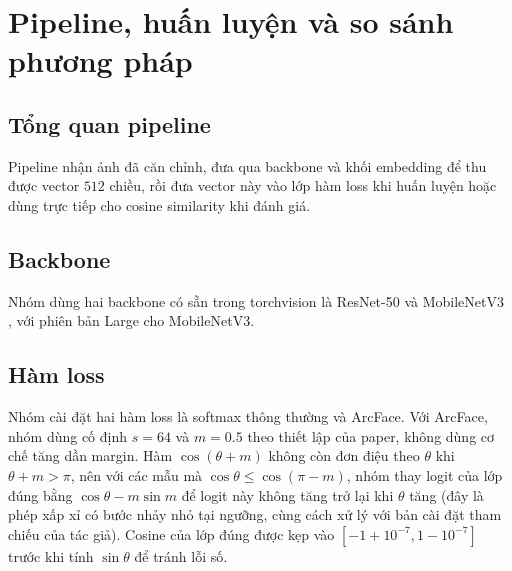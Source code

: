 \documentclass[a4paper,12pt]{article}
\begin{document}
\section{Pipeline, huấn luyện và so sánh phương pháp}\label{sec:training}

\subsection{Tổng quan pipeline}
Pipeline nhận ảnh đã căn chỉnh, đưa qua backbone và khối embedding để thu được vector $512$ chiều, rồi đưa vector này vào lớp hàm loss khi huấn luyện hoặc dùng trực tiếp cho cosine similarity khi đánh giá.

\subsection{Backbone}
Nhóm dùng hai backbone có sẵn trong torchvision là ResNet-50 \cite{he2016resnet} và MobileNetV3 \cite{howard2019mobilenetv3}, với phiên bản Large cho MobileNetV3.

\subsection{Hàm loss}
Nhóm cài đặt hai hàm loss là softmax thông thường và ArcFace. Với ArcFace, nhóm dùng cố định $s = 64$ và $m = 0.5$ theo thiết lập của paper, không dùng cơ chế tăng dần margin. Hàm $\cos(\theta + m)$ không còn đơn điệu theo $\theta$ khi $\theta + m > \pi$, nên với các mẫu mà $\cos\theta \le \cos(\pi - m)$, nhóm thay logit của lớp đúng bằng $\cos\theta - m \sin m$ để logit này không tăng trở lại khi $\theta$ tăng (đây là phép xấp xỉ có bước nhảy nhỏ tại ngưỡng, cùng cách xử lý với bản cài đặt tham chiếu của tác giả). Cosine của lớp đúng được kẹp vào $[-1 + 10^{-7}, 1 - 10^{-7}]$ trước khi tính $\sin\theta$ để tránh lỗi số.
\end{document}
